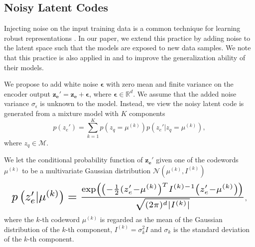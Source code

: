 \documentclass[letterpaper]{article} %
\begin{document}
\subsection{Noisy Latent Codes}
Injecting noise on the input training data is a common technique for learning robust representations \cite{bengio:AAAI:17}. In our paper, we extend this practice by adding noise to the latent space such  that the models are exposed to new data samples. We note that this practice is also applied in \cite{DBLP:journals/corr/abs-1811-07557} and \cite{pmlr-v32-rezende14} to improve the generalization ability of their models.

We propose to add white noise $\bm{\epsilon}$ with zero mean and finite variance on the encoder output $\mathbf{z_e'} = \mathbf{z_e} + \bm{\epsilon}$, where $\bm{\epsilon} \in \mathbb{R}^d$.  We assume that the added noise variance $\sigma_\epsilon$ is unknown to the model. Instead, we view the noisy latent code is generated from a mixture model with $K$ components
\begin{equation}
\label{eq:gmm_generative}
p(z_e') = \sum_{k = 1}^K p\left(z_q = \mu^{(k)}\right)p\left(z_e'|z_q = \mu^{(k)}\right),
\end{equation}
where $z_q \in \mathcal{M}$.

We let the conditional probability function of $\mathbf{z_e'}$ given one of the codewords $\mu^{(k)}$ to be a multivariate Gaussian distribution $\mathcal{N}\left(\mu^{(k)}, I^{(k)}\right)$
\begin{equation}
\label{eq:componentGaussian}
\resizebox{.97\hsize}{!}
{$p\left(z_e'|\mu^{(k)}\right) = \frac{\exp\left(\left(-\frac{1}{2}(z_e'-\mu^{(k)}\right)^T I^{(k)-1}\left(z_e'-\mu^{(k)}\right)\right)}{\sqrt{(2\pi)^d|I^{(k)}|}}$},
\end{equation}
where the $k$-th codeword $\mu^{(k)}$ is regarded as the mean of the Gaussian distribution of the $k$-th component, $I^{(k)} = \sigma_k^2I$ and $\sigma_k$ is the standard deviation of the $k$-th component.
\end{document}
